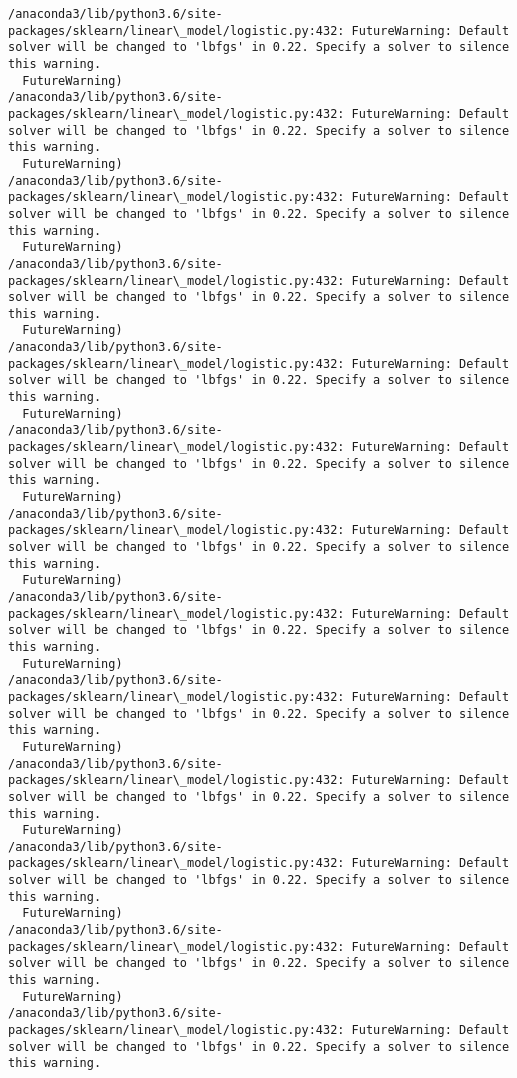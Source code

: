 \documentclass[11pt]{article}
\begin{document}
    \begin{Verbatim}[commandchars=\\\{\}]
/anaconda3/lib/python3.6/site-packages/sklearn/linear\_model/logistic.py:432: FutureWarning: Default solver will be changed to 'lbfgs' in 0.22. Specify a solver to silence this warning.
  FutureWarning)
/anaconda3/lib/python3.6/site-packages/sklearn/linear\_model/logistic.py:432: FutureWarning: Default solver will be changed to 'lbfgs' in 0.22. Specify a solver to silence this warning.
  FutureWarning)
/anaconda3/lib/python3.6/site-packages/sklearn/linear\_model/logistic.py:432: FutureWarning: Default solver will be changed to 'lbfgs' in 0.22. Specify a solver to silence this warning.
  FutureWarning)
/anaconda3/lib/python3.6/site-packages/sklearn/linear\_model/logistic.py:432: FutureWarning: Default solver will be changed to 'lbfgs' in 0.22. Specify a solver to silence this warning.
  FutureWarning)
/anaconda3/lib/python3.6/site-packages/sklearn/linear\_model/logistic.py:432: FutureWarning: Default solver will be changed to 'lbfgs' in 0.22. Specify a solver to silence this warning.
  FutureWarning)
/anaconda3/lib/python3.6/site-packages/sklearn/linear\_model/logistic.py:432: FutureWarning: Default solver will be changed to 'lbfgs' in 0.22. Specify a solver to silence this warning.
  FutureWarning)
/anaconda3/lib/python3.6/site-packages/sklearn/linear\_model/logistic.py:432: FutureWarning: Default solver will be changed to 'lbfgs' in 0.22. Specify a solver to silence this warning.
  FutureWarning)
/anaconda3/lib/python3.6/site-packages/sklearn/linear\_model/logistic.py:432: FutureWarning: Default solver will be changed to 'lbfgs' in 0.22. Specify a solver to silence this warning.
  FutureWarning)
/anaconda3/lib/python3.6/site-packages/sklearn/linear\_model/logistic.py:432: FutureWarning: Default solver will be changed to 'lbfgs' in 0.22. Specify a solver to silence this warning.
  FutureWarning)
/anaconda3/lib/python3.6/site-packages/sklearn/linear\_model/logistic.py:432: FutureWarning: Default solver will be changed to 'lbfgs' in 0.22. Specify a solver to silence this warning.
  FutureWarning)
/anaconda3/lib/python3.6/site-packages/sklearn/linear\_model/logistic.py:432: FutureWarning: Default solver will be changed to 'lbfgs' in 0.22. Specify a solver to silence this warning.
  FutureWarning)
/anaconda3/lib/python3.6/site-packages/sklearn/linear\_model/logistic.py:432: FutureWarning: Default solver will be changed to 'lbfgs' in 0.22. Specify a solver to silence this warning.
  FutureWarning)
/anaconda3/lib/python3.6/site-packages/sklearn/linear\_model/logistic.py:432: FutureWarning: Default solver will be changed to 'lbfgs' in 0.22. Specify a solver to silence this warning.

\end{Verbatim}
\end{document}
